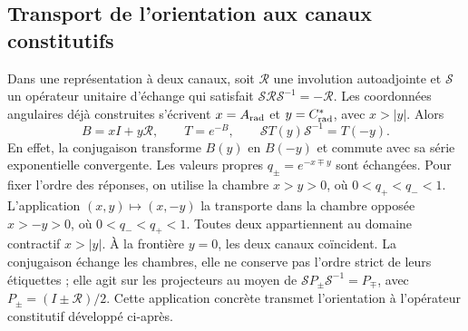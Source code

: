 \subsection{Transport de l’orientation aux canaux constitutifs}

Dans une représentation à deux canaux, soit $\mathcal R$ une involution
autoadjointe et $\mathcal S$ un opérateur unitaire d’échange qui satisfait
$\mathcal S\mathcal R\mathcal S^{-1}=-\mathcal R$. Les coordonnées angulaires
déjà construites s’écrivent $x=A_{\rm rad}$ et $y=C^*_{\rm rad}$, avec $x>|y|$.
Alors
\begin{equation}
 B=xI+y\mathcal R,\qquad T=e^{-B},\qquad
 \mathcal ST(y)\mathcal S^{-1}=T(-y).
 \label{iii:eq:channel-conjugation}
\end{equation}
En effet, la conjugaison transforme $B(y)$ en $B(-y)$ et commute avec sa série
exponentielle convergente. Les valeurs propres $q_\pm=e^{-x\mp y}$ sont échangées.
Pour fixer l’ordre des réponses, on utilise la chambre $x>y>0$, où
$0<q_+<q_-<1$. L’application $(x,y)\mapsto(x,-y)$ la transporte dans la
chambre opposée $x>-y>0$, où $0<q_-<q_+<1$. Toutes deux appartiennent au domaine
contractif $x>|y|$. À la frontière $y=0$, les deux canaux coïncident.
La conjugaison échange les chambres, elle ne conserve pas l’ordre strict de
leurs étiquettes ; elle agit sur les projecteurs au moyen de
$\mathcal SP_\pm\mathcal S^{-1}=P_\mp$, avec
$P_\pm=(I\pm\mathcal R)/2$.
Cette application concrète transmet l’orientation à l’opérateur constitutif
développé ci-après.
